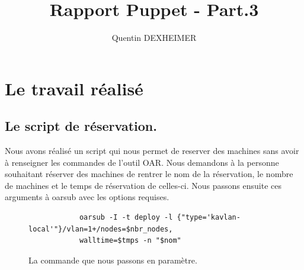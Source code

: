 \documentclass[a4paper,10pt]{article}
\author{Quentin DEXHEIMER}
\title{Rapport Puppet - Part.3}
\begin{document}
	\section{Le travail réalisé}
		\subsection{Le script de réservation.}
Nous avons réalisé un script qui nous permet de reserver des machines sans avoir à renseigner les commandes de l'outil OAR. Nous demandons à la personne souhaitant réserver des machines de rentrer le nom de la réservation, le nombre de machines et le temps de réservation de celles-ci. Nous passons ensuite ces arguments à oarsub avec les options requises.
			
		\begin{figure}[!h]
			\centering
			\begin{verbatim}
			oarsub -I -t deploy -l {"type='kavlan-local'"}/vlan=1+/nodes=$nbr_nodes,
			walltime=$tmps -n "$nom"
			\end{verbatim}			
			\caption{La commande que nous passons en paramètre.}
		\end{figure}
		
\end{document}
